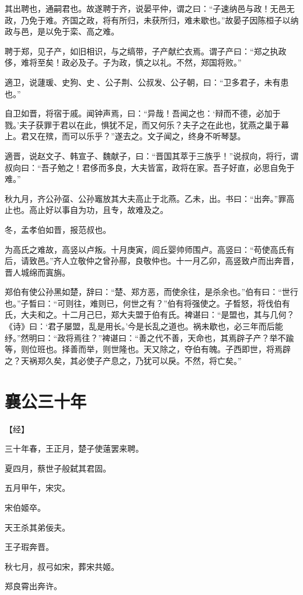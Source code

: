 \documentclass[a4paper,12pt,UTF8,twoside]{ctexbook}
\begin{document}
其出聘也，通嗣君也。故遂聘于齐，说晏平仲，谓之曰：“子速纳邑与政！无邑无政，乃免于难。齐国之政，将有所归，未获所归，难未歇也。”故晏子因陈桓子以纳政与邑，是以免于栾、高之难。

聘于郑，见子产，如旧相识，与之缟带，子产献纻衣焉。谓子产曰：“郑之执政侈，难将至矣！政必及子。子为政，慎之以礼。不然，郑国将败。”

適卫，说蘧瑗、史狗、史、公子荆、公叔发、公子朝，曰：“卫多君子，未有患也。”

自卫如晋，将宿于戚。闻钟声焉，曰：“异哉！吾闻之也：‘辩而不德，必加于戮。’夫子获罪于君以在此，惧犹不足，而又何乐？夫子之在此也，犹燕之巢于幕上。君又在殡，而可以乐乎？”遂去之。文子闻之，终身不听琴瑟。

適晋，说赵文子、韩宣子、魏献子，曰：“晋国其萃于三族乎！”说叔向，将行，谓叔向曰：“吾子勉之！君侈而多良，大夫皆富，政将在家。吾子好直，必思自免于难。”

秋九月，齐公孙虿、公孙竈放其大夫高止于北燕。乙未，出。书曰：“出奔。”罪高止也。高止好以事自为功，且专，故难及之。

冬，孟孝伯如晋，报范叔也。

为高氏之难故，高竖以卢叛。十月庚寅，闾丘婴帅师围卢。高竖曰：“苟使高氏有后，请致邑。”齐人立敬仲之曾孙酀，良敬仲也。十一月乙卯，高竖致卢而出奔晋，晋人城绵而寘旃。

郑伯有使公孙黑如楚，辞曰：“楚、郑方恶，而使余往，是杀余也。”伯有曰：“世行也。”子晳曰：“可则往，难则已，何世之有？”伯有将强使之。子晳怒，将伐伯有氏，大夫和之。十二月己巳，郑大夫盟于伯有氏。裨谌曰：“是盟也，其与几何？《诗》曰：‘君子屡盟，乱是用长。’今是长乱之道也。祸未歇也，必三年而后能纾。”然明曰：“政将焉往？”裨谌曰：“善之代不善，天命也，其焉辟子产？举不踰等，则位班也。择善而举，则世隆也。天又除之，夺伯有魄。子西即世，将焉辟之？天祸郑久矣，其必使子产息之，乃犹可以戾。不然，将亡矣。”

\section{襄公三十年}


【经】

三十年春，王正月，楚子使薳罢来聘。

夏四月，蔡世子般弑其君固。

五月甲午，宋灾。

宋伯姬卒。

天王杀其弟佞夫。

王子瑕奔晋。

秋七月，叔弓如宋，葬宋共姬。

郑良霄出奔许。
\end{document}
